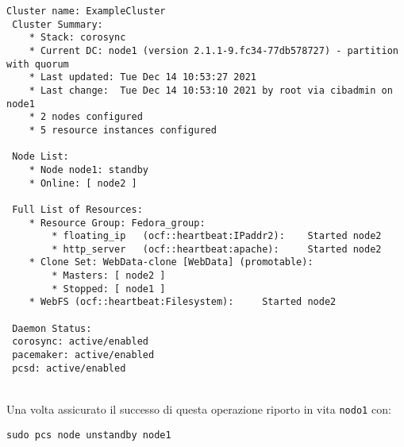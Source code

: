 \begin{lstlisting}[style=output]
 Cluster name: ExampleCluster
 Cluster Summary:
    * Stack: corosync
    * Current DC: node1 (version 2.1.1-9.fc34-77db578727) - partition with quorum
    * Last updated: Tue Dec 14 10:53:27 2021
    * Last change:  Tue Dec 14 10:53:10 2021 by root via cibadmin on node1
    * 2 nodes configured
    * 5 resource instances configured

 Node List:
    * Node node1: standby
    * Online: [ node2 ]

 Full List of Resources:
    * Resource Group: Fedora_group:
        * floating_ip	(ocf::heartbeat:IPaddr2):	 Started node2
        * http_server	(ocf::heartbeat:apache):	 Started node2
    * Clone Set: WebData-clone [WebData] (promotable):
        * Masters: [ node2 ]
        * Stopped: [ node1 ]
    * WebFS	(ocf::heartbeat:Filesystem):	 Started node2

 Daemon Status:
 corosync: active/enabled
 pacemaker: active/enabled
 pcsd: active/enabled
\end{lstlisting}
\ \\
Una volta assicurato il successo di questa operazione riporto in vita \lstinline[style=cmd]|nodo1| con:

\begin{lstlisting}[style=cmd]
 sudo pcs node unstandby node1
\end{lstlisting}